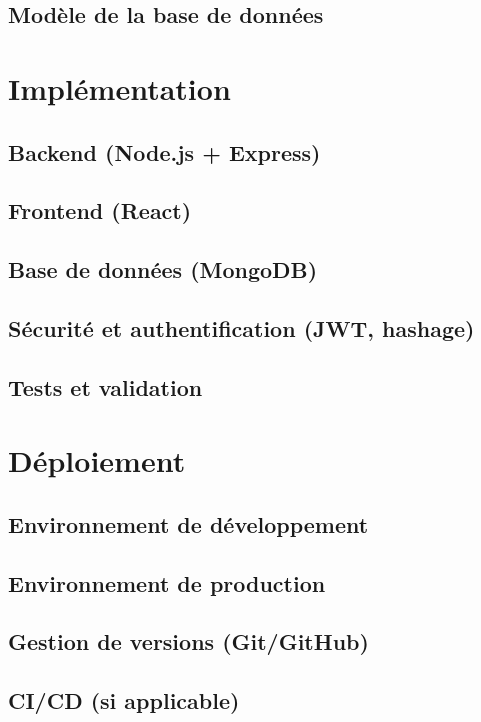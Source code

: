 \documentclass[12pt,a4paper]{report}
\begin{document}
\section{Modèle de la base de données}

\chapter{Implémentation}
\section{Backend (Node.js + Express)}
\section{Frontend (React)}
\section{Base de données (MongoDB)}
\section{Sécurité et authentification (JWT, hashage)}
\section{Tests et validation}

\chapter{Déploiement}
\section{Environnement de développement}
\section{Environnement de production}
\section{Gestion de versions (Git/GitHub)}
\section{CI/CD (si applicable)}

\end{document}
